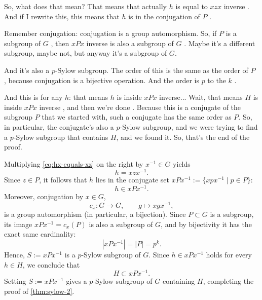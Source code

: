 \begin{proofWrapper}
\begin{hidden}
\end{hidden}

\begin{speech}[00:32:09 - 00:33:28]
So, what does that mean? That means that actually $h$ is equal to $x z x$ inverse . And if I rewrite this, this means that $h$ is in the conjugation of $P$ .

Remember conjugation: conjugation is a group automorphism. So, if $P$ is a subgroup of $G$ , then $x P x$ inverse is also a subgroup of $G$ . Maybe it's a different subgroup, maybe not, but anyway it's a subgroup of $G$.

And it's also a $p$-Sylow subgroup. The order of this is the same as the order of $P$ , because conjugation is a bijective operation. And the order is $p$ to the $k$ .

And this is for any $h$: that means $h$ is inside $x P x$ inverse... Wait, that means $H$ is inside $x P x$ inverse , and then we're done . Because this is a conjugate of the subgroup $P$ that we started with, such a conjugate has the same order as $P$. So, in particular, the conjugate's also a $p$-Sylow subgroup, and we were trying to find a $p$-Sylow subgroup that contains $H$, and we found it. So, that's the end of the proof.
\end{speech}

\begin{content}
Multiplying \eqref{eq:hx-equals-xz} on the right by $x^{-1} \in G$ yields
\[
h = x z x^{-1}.
\]
Since $z \in P$, it follows that $h$ lies in the conjugate set $x P x^{-1} := \{ x p x^{-1} \mid p \in P \}$:
\[
h \in x P x^{-1}.
\]
Moreover, conjugation by $x \in G$,
\[
c_x \colon G \to G, \qquad g \mapsto x g x^{-1},
\]
is a group automorphism (in particular, a bijection). Since $P \subset G$ is a subgroup, its image $x P x^{-1} = c_x(P)$ is also a subgroup of $G$, and by bijectivity it has the exact same cardinality:
\[
|x P x^{-1}| = |P| = p^k.
\]
Hence, $S := x P x^{-1}$ is a $p$-Sylow subgroup of $G$. Since $h \in x P x^{-1}$ holds for every $h \in H$, we conclude that
\[
H \subset x P x^{-1}.
\]
Setting $S := x P x^{-1}$ gives a $p$-Sylow subgroup of $G$ containing $H$, completing the proof of \cref{thm:sylow-2}.


\end{content}
\end{proofWrapper}
